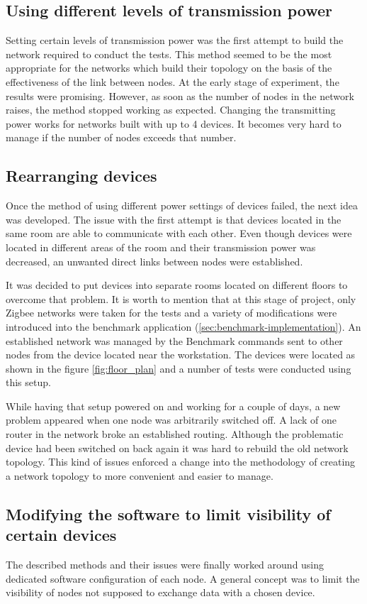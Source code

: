 \subsection*{Using different levels of transmission power}
Setting certain levels of transmission power was the first attempt
to build the network required to conduct the tests. This method seemed to be the
most appropriate for the networks which build their topology on the basis of
the effectiveness of the link between nodes. At the early stage of experiment,
the results were promising. However, as soon as the number of nodes in the 
network raises, the method stopped working as expected. Changing the 
transmitting power works for networks built with up to 4 devices. It becomes
very hard to manage if the number of nodes exceeds that number.

\subsection*{Rearranging devices}
Once the method of using different power settings of devices failed, the next
idea was developed. The issue with the first attempt is that devices located
in the same room are able to communicate with each other. Even though devices
were located in different areas of the room and their transmission power was
decreased, an unwanted direct links between nodes were established.

It was decided to put devices into separate rooms located on different floors to overcome that problem. It is worth to mention that at this stage of project, only Zigbee 
networks were taken for the tests and a variety of modifications were introduced
into the benchmark application (\ref{sec:benchmark-implementation}). An 
established network was managed by the Benchmark commands sent to other nodes
from the device located near the workstation. The devices
were located as shown in the figure \ref{fig:floor_plan} and a number of
tests were conducted using this setup.

While having that setup powered on and working for a couple of days, a new 
problem appeared when one node was arbitrarily switched off. A lack of
one router in the network broke an established routing. Although the problematic
device had been switched on back again it was hard to rebuild the old network
topology. This kind of issues enforced a change into the methodology of
creating a network topology to more convenient and easier to manage.

\subsection*{Modifying the software to limit visibility of certain devices}
The described methods and their issues were finally 
worked around using dedicated software configuration of each node. A general 
concept was to limit the visibility of nodes not supposed to exchange data 
with a chosen device.

